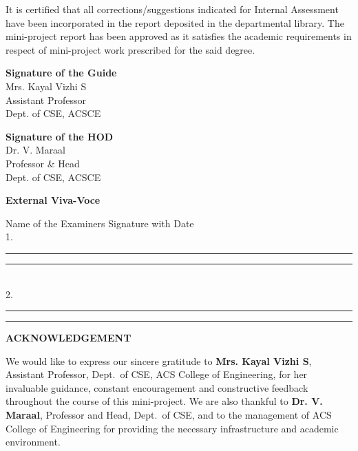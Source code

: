 \documentclass[12pt, a4paper]{article}
\begin{document}
It is certified that all corrections/suggestions indicated for Internal Assessment have been
incorporated in the report deposited in the departmental library. The mini-project report
has been approved as it satisfies the academic requirements in respect of mini-project
work prescribed for the said degree.

\vspace{2cm}
\noindent
\begin{minipage}{0.45\textwidth}
  \textbf{Signature of the Guide}\\[0.2cm]
  Mrs. Kayal Vizhi S\\
  Assistant Professor\\
  Dept. of CSE, ACSCE
\end{minipage}
\hfill
\begin{minipage}{0.45\textwidth}
  \begin{flushright}
    \textbf{Signature of the HOD}\\[0.2cm]
    Dr. V. Maraal\\
    Professor \& Head\\
    Dept. of CSE, ACSCE
  \end{flushright}
\end{minipage}

\vspace{2cm}
\begin{center}
  \textbf{External Viva-Voce}
\end{center}

\vspace{0.5cm}
\noindent
Name of the Examiners \hfill Signature with Date\\[0.3cm]
1.\ \rule{6cm}{0.4pt} \hfill \rule{4cm}{0.4pt}\\[0.3cm]
2.\ \rule{6cm}{0.4pt} \hfill \rule{4cm}{0.4pt}

\newpage
\thispagestyle{fancy}
\begin{center}
  {\Large \textbf{ACKNOWLEDGEMENT}}
\end{center}
\vspace{0.8cm}

We would like to express our sincere gratitude to \textbf{Mrs. Kayal Vizhi S},
Assistant Professor, Dept.\ of CSE, ACS College of Engineering, for her invaluable
guidance, constant encouragement and constructive feedback throughout the course
of this mini-project. We are also thankful to \textbf{Dr. V. Maraal}, Professor and
Head, Dept.\ of CSE, and to the management of ACS College of Engineering for
providing the necessary infrastructure and academic environment.
\end{document}
